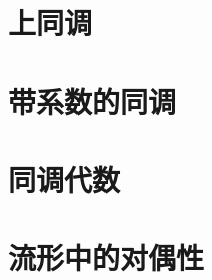 \documentclass[UTF8,11pt,openany]{ctexbook}
\begin{document}
\chapter{上同调}










\chapter{带系数的同调}



\chapter{同调代数}











\chapter{流形中的对偶性}














\backmatter





\end{document}
